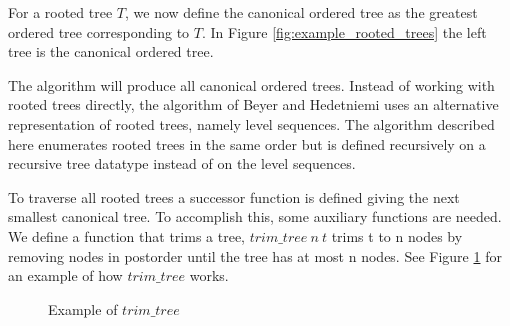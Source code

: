 For a rooted tree $T$, we now define the canonical ordered tree as the greatest ordered tree corresponding to $T$.
In Figure \ref{fig:example_rooted_trees} the left tree is the canonical ordered tree.

The algorithm will produce all canonical ordered trees.
Instead of working with rooted trees directly, the algorithm of Beyer and Hedetniemi uses an alternative representation of rooted trees, namely level sequences.
The algorithm described here enumerates rooted trees in the same order but is defined recursively on a recursive tree datatype instead of on the level sequences.

To traverse all rooted trees a successor function is defined giving the next smallest canonical tree.
To accomplish this, some auxiliary functions are needed.
We define a function that trims a tree, $trim\_tree\ n\ t$ trims t to n nodes by removing nodes in postorder until the tree has at most n nodes.
See Figure \ref{fig:trim_tree_example} for an example of how $trim\_tree$ works.

\begin{figure}[htpb]
\centering
{}
\caption{Example of $trim\_tree$}
\label{fig:trim_tree_example}
\end{figure}

